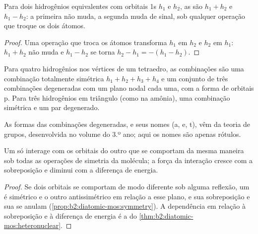 \begin{proposition}\label{prop:b2:fragment-orbitals:h2-pair}
Para dois hidrogênios equivalentes com orbitais 1s $h_1$ e $h_2$, as
 são $h_1 + h_2$ e $h_1 - h_2$: a primeira não
muda, a segunda muda de sinal, sob qualquer operação que troque os dois
átomos.
\end{proposition}

\begin{proof}
Uma operação que troca os átomos transforma $h_1$ em $h_2$ e $h_2$ em
$h_1$: $h_1 + h_2$ não muda e $h_1 - h_2$ se torna $h_2 - h_1 = -(h_1 - h_2)$.
\end{proof}

\begin{proposition}\label{prop:b2:fragment-orbitals:h4}
Para quatro hidrogênios nos vértices de um tetraedro, as combinações são uma
combinação totalmente simétrica $h_1 + h_2 + h_3 + h_4$ e um conjunto de três
combinações degeneradas com um plano nodal cada uma, com a forma de orbitais
p. Para três hidrogênios em triângulo (como na amônia), uma combinação
simétrica e um par degenerado.
\end{proposition}

\admitted

As formas das combinações degeneradas, e seus nomes (a, e, t), vêm da teoria
de grupos, desenvolvida no volume do 3.º ano; aqui os nomes são apenas rótulos.

\begin{proposition}\label{prop:b2:fragment-orbitals:interaction-rules}
Um  só interage com os orbitais do outro  que se
comportam da mesma maneira sob todas as operações de simetria da molécula; a
força da interação cresce com a sobreposição e diminui com a diferença de
energia.
\end{proposition}

\begin{proof}
Se dois orbitais se comportam de modo diferente sob alguma reflexão, um é
simétrico e o outro antissimétrico em relação a esse plano, e sua sobreposição
e sua  se anulam (\cref{prop:b2:diatomic-mos:symmetry}).
A dependência em relação à sobreposição e à diferença de energia é a do
\cref{thm:b2:diatomic-mos:heteronuclear}.
\end{proof}

